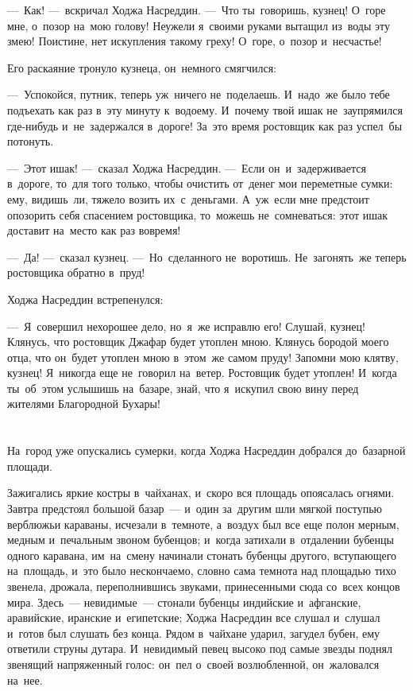 \documentclass[12pt,a4paper]{book}
\begin{document}
—~Как! —~вскричал Ходжа Насреддин. —~Что ты~говоришь, кузнец! О~горе мне, о~позор на~мою голову! Неужели я~своими руками вытащил из~воды эту змею! Поистине, нет искупления такому греху! О~горе, о~позор и~несчастье!

Его раскаяние тронуло кузнеца, он~немного смягчился:

—~Успокойся, путник, теперь уж~ничего не~поделаешь. И~надо~же было тебе подъехать как раз в~эту минуту к~водоему. И~почему твой ишак не~заупрямился где-нибудь и~не~задержался в~дороге! За~это время ростовщик как раз успел~бы потонуть.

—~Этот ишак! —~сказал Ходжа Насреддин. —~Если он~и~задерживается в~дороге, то~для того только, чтобы очистить от~денег мои переметные сумки: ему, видишь~ли, тяжело возить их~с~деньгами. А~уж~если мне предстоит опозорить себя спасением ростовщика, то~можешь не~сомневаться: этот ишак доставит на~место как раз вовремя!

—~Да! —~сказал кузнец. —~Но~сделанного не~воротишь. Не~загонять~же теперь ростовщика обратно в~пруд!

Ходжа Насреддин встрепенулся:

—~Я~совершил нехорошее дело, но~я~же исправлю его! Слушай, кузнец! Клянусь, что ростовщик Джафар будет утоплен мною. Клянусь бородой моего отца, что он~будет утоплен мною в~этом~же самом пруду! Запомни мою клятву, кузнец! Я~никогда еще не~говорил на~ветер. Ростовщик будет утоплен! И~когда ты~об~этом услышишь на~базаре, знай, что я~искупил свою вину перед жителями Благородной Бухары!


\chapter{}

На~город уже опускались сумерки, когда Ходжа Насреддин добрался до~базарной площади.

Зажигались яркие костры в~чайханах, и~скоро вся площадь опоясалась огнями. Завтра предстоял большой базар~— и~один за~другим шли мягкой поступью верблюжьи караваны, исчезали в~темноте, а~воздух был все еще полон мерным, медным и~печальным звоном бубенцов; и~когда затихали в~отдалении бубенцы одного каравана, им~на~смену начинали стонать бубенцы другого, вступающего на~площадь, и~это было нескончаемо, словно сама темнота над площадью тихо звенела, дрожала, переполнившись звуками, принесенными сюда со~всех концов мира. Здесь~— невидимые~— стонали бубенцы индийские и~афганские, аравийские, иранские и~египетские; Ходжа Насреддин все слушал и~слушал и~готов был слушать без конца. Рядом в~чайхане ударил, загудел бубен, ему ответили струны дутара. И~невидимый певец высоко под самые звезды поднял звенящий напряженный голос: он~пел о~своей возлюбленной, он~жаловался на~нее.
\end{document}

